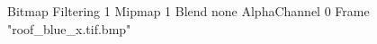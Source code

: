 {Bitmap
	{Filtering 1}
	{Mipmap 1}
	{Blend none}
	{AlphaChannel 0}
	{Frame "roof_blue_x.tif.bmp"}
}
